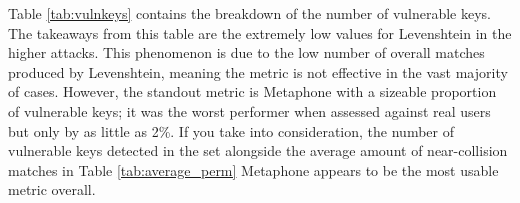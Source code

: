 \begin{table}[!h]
    \centering

    \caption{Number of vulnerable keys per metric}
    \label{tab:vulnkeys}
\end{table}

Table \ref{tab:vulnkeys} contains the breakdown of the number of vulnerable keys. The takeaways from this table are the extremely low values for Levenshtein in the higher attacks. This phenomenon is due to the low number of overall matches produced by Levenshtein, meaning the metric is not effective in the vast majority of cases. However, the standout metric is Metaphone with a sizeable proportion of vulnerable keys; it was the worst performer when assessed against real users but only by as little as 2\%. If you take into consideration, the number of vulnerable keys detected in the set alongside the average amount of near-collision matches in Table \ref{tab:average_perm} Metaphone appears to be the most usable metric overall.

